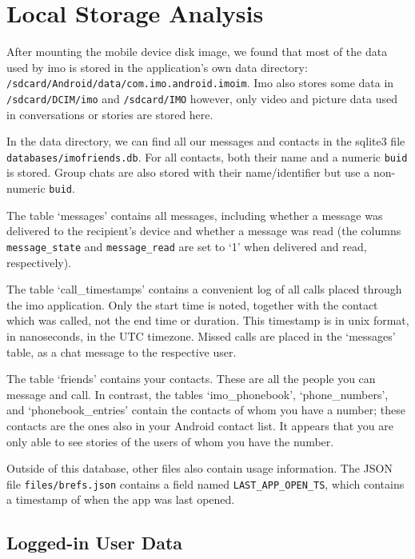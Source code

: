 \documentclass[conference]{IEEEtran}
\begin{document}
\section{Local Storage Analysis}\label{sec:storage}

After mounting the mobile device disk image, we found that most of the data used
by imo is stored in the application's own data directory:
\texttt{/sdcard/Android/data/com.imo.android.imoim}. Imo also stores some data
in \texttt{/sdcard/DCIM/imo} and \texttt{/sdcard/IMO} however, only video and
picture data used in conversations or stories are stored here.

In the data directory, we can find all our messages and contacts in the sqlite3
file \texttt{databases/imofriends.db}. For all contacts, both their name and a
numeric \texttt{buid} is stored. Group chats are also stored with their
name/identifier but use a non-numeric \texttt{buid}.

The table `messages' contains all messages, including whether a message was
delivered to the recipient's device and whether a message was read (the columns
\texttt{message\_state} and \texttt{message\_read} are set to `1' when
delivered and read, respectively).

The table `call\_timestamps' contains a convenient log of all calls placed
through the imo application. Only the start time is noted, together with the
contact which was called, not the end time or duration. This timestamp is in
unix format, in nanoseconds, in the UTC timezone. Missed calls are placed in
the `messages' table, as a chat message to the respective user.

The table `friends' contains your contacts. These are all the people you can
message and call. In contrast, the tables `imo\_phonebook', `phone\_numbers',
and `phonebook\_entries' contain the contacts of whom you have a number; these
contacts are the ones also in your Android contact list. It appears that you
are only able to see stories of the users of whom you have the number.

Outside of this database, other files also contain usage information. The JSON
file \texttt{files/brefs.json} contains a field named
\texttt{LAST\_APP\_OPEN\_TS}, which contains a timestamp of when the app was
last opened.


\subsection{Logged-in User Data}
\end{document}
